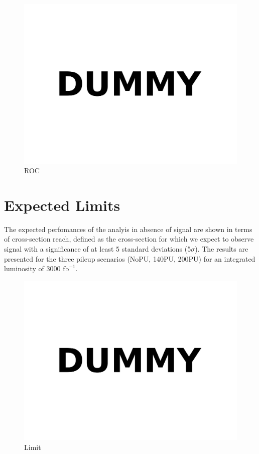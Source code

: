 \documentclass[11pt,twoside,a4paper]{article}
\begin{document}
\begin{figure}
\centering
\includegraphics[width=.5\textwidth]{figures/dummy.pdf}
\caption{ROC\label{fig:roc}}
\end{figure}

\section{Expected Limits}

The expected perfomances of the analyis in absence of signal are shown in terms of cross-section reach, defined as the cross-section for which we expect to observe signal with a significance of at least 5 standard deviations (5$\sigma$).
The results are presented for the three pileup scenarios (NoPU, 140PU, 200PU) for an integrated luminosity of 3000 $\mathrm{fb}^{-1}$.

\begin{figure}
\centering
\includegraphics[width=.5\textwidth]{figures/dummy.pdf}
\caption{Limit\label{fig:limit}}
\end{figure}
\end{document}
